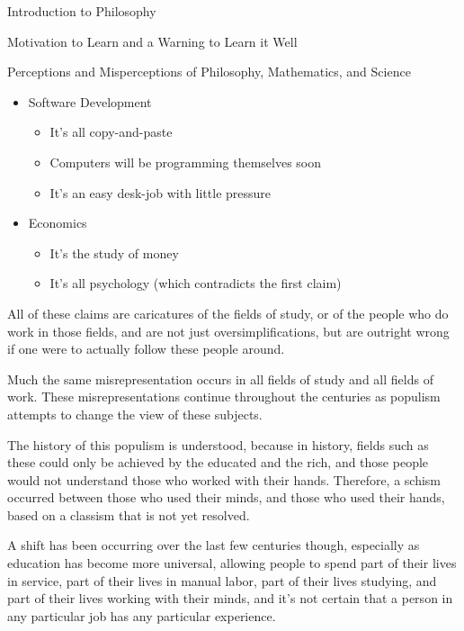 \begin{chapter}{Introduction to Philosophy}
\begin{section}{Motivation to Learn and a Warning to Learn it Well}
\begin{samepage}
\begin{subsection}{Perceptions and Misperceptions of Philosophy, Mathematics, and Science}
\begin{itemize}
                    \item Software Development
                    \begin{itemize}
                        \item It's all copy-and-paste
                        \item Computers will be programming themselves soon
                        \item It's an easy desk-job with little pressure
                    \end{itemize}
                        
                    \item Economics
                    \begin{itemize}
                        \item It's the study of money
                        \item It's all psychology (which contradicts the first claim)
                    \end{itemize}
                \end{itemize}
            \end{subsection}
        \end{samepage}
            
        All of these claims are caricatures of the fields of study, or of the people who do work in those fields, and are not just oversimplifications, but are outright wrong if one were to actually follow these people around.
            
        Much the same misrepresentation occurs in all fields of study and all fields of work. These misrepresentations continue throughout the centuries as populism attempts to change the view of these subjects.
            
        The history of this populism is understood, because in history, fields such as these could only be achieved by the educated and the rich, and those people would not understand those who worked with their hands. Therefore, a schism occurred between those who used their minds, and those who used their hands, based on a classism that is not yet resolved.
            
        A shift has been occurring over the last few centuries though, especially as education has become more universal, allowing people to spend part of their lives in service, part of their lives in manual labor, part of their lives studying, and part of their lives working with their minds, and it's not certain that a person in any particular job has any particular experience.
            

\end{section}
\end{chapter}
